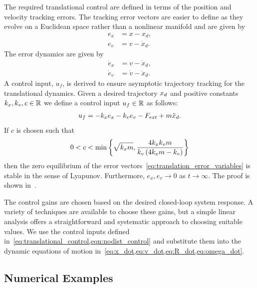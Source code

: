 \documentclass[journal]{new-aiaa}
\begin{document}
The required translational control are defined in terms of the position and velocity tracking errors.
The tracking error vectors are easier to define as they evolve on a Euclidean space rather than a nonlinear manifold and are given by
\begin{subequations}\label{eq:translation_error_variables}
\begin{align}
    e_x &= x - x_d ,\\
    e_v &= v - \dot{x}_d.
\end{align}
\end{subequations}
The error dynamics are given by
\begin{subequations}\label{eq:translation_error_dynamics}
\begin{align}
    \dot{e}_x &= v - \dot{x}_d, \\
    \dot{e}_v &= \dot{v} - \ddot{x}_d .
\end{align}
\end{subequations}
A control input, \( u_f \), is derived to ensure asymptotic trajectory tracking for the translational dynamics.
    Given a desired trajectory \( x_d \) and positive constants \( k_x, k_v, c \in \mathbb{R} \) we define a control input \( u_f \in \mathbb{R} \) as follows:
    \begin{align}\label{eq:translational_control}
        u_f = -k_x e_x - k_v e_v - F_{ext} + m \ddot{x}_d .
    \end{align}
    If \( c \) is chosen such that
    \begin{align}\label{eq:translational_control_gain_bound}
        0 < c < \min \left\{ \sqrt{k_x m}, \frac{4 k_x k_v m}{ k_v \left( 4 k_x m - k_v \right) }    \right\}
    \end{align}
    then the zero equilibrium of the error vectors~\cref{eq:translation_error_variables} is stable in the sense of Lyapunov.
    Furthermore, \( e_x, e_v \to 0 \) as \( t \to \infty\).
    The proof is shown in~\cite{kulumani2017a}.

The control gains are chosen based on the desired closed-loop system response. 
A variety of techniques are available to choose these gains, but a simple linear analysis offers a straightforward and systematic approach to choosing suitable values. 
We use the control inputs defined in~\cref{eq:translational_control,eqn:nodist_control} and substitute them into the dynamic equations of motion in~\cref{eq:x_dot,eq:v_dot,eq:R_dot,eq:omega_dot}.

\subsection{Numerical Examples}
\end{document}
